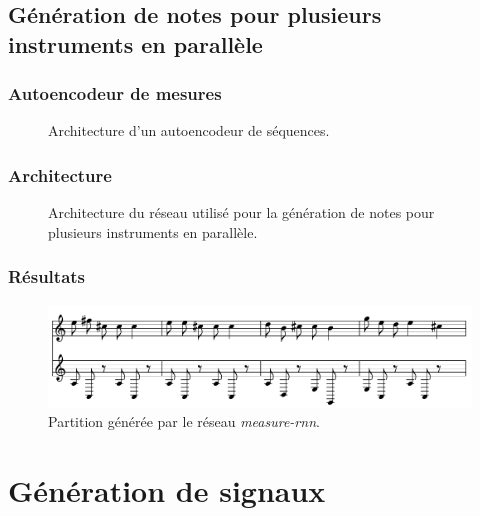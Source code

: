 \subsection{Génération de notes pour plusieurs instruments en parallèle}

\subsubsection{Autoencodeur de mesures}

\begin{figure}[h!]
\begin{center}

\caption{Architecture d'un autoencodeur de séquences.}
\end{center}
\end{figure}

\subsubsection{Architecture}

\begin{figure}[h!]
\begin{center}

\caption{Architecture du réseau utilisé pour la génération de notes pour plusieurs instruments en parallèle.}
\end{center}
\end{figure}

\subsubsection{Résultats}

\begin{figure}[h!]
\begin{center}
\includegraphics[scale=0.3]{images/chapter9/measure_rnn_result.png}
\caption{Partition générée par le réseau \textit{measure-rnn}.}
\end{center}
\end{figure}

\section{Génération de signaux}
